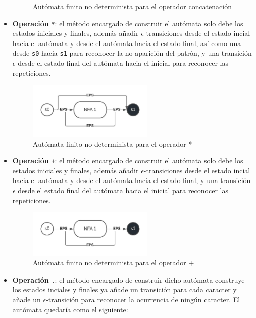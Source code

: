 \begin{itemize}
\begin{figure}
                        \caption{Autómata finito no determinista para el operador concatenación}
                \end{figure}
        \item \textbf{Operación} \verb|*|: el método encargado de construir el autómata solo debe los estados iniciales y finales, además añadir $\epsilon$-transiciones desde el estado incial hacia el autómata y desde el autómata hacia el estado final, así como una desde \verb|s0| hacia \verb|s1| para reconocer la no aparición del patrón, y una transición $\epsilon$ desde el estado final del autómata hacia el inicial para reconocer las repeticiones.
                \begin{figure}
                        \centering
                        \includegraphics[width=6cm]{./chapters/img/star.jpeg}
                        \caption{Autómata finito no determinista para el operador *}
                \end{figure}
        \item \textbf{Operación} \verb|+|: el método encargado de construir el autómata solo debe los estados iniciales y finales, además añadir $\epsilon$-transiciones desde el estado incial hacia el autómata y desde el autómata hacia el estado final, y una transición $\epsilon$ desde el estado final del autómata hacia el inicial para reconocer las repeticiones.
                \begin{figure}
                        \centering
                        \includegraphics[width=6cm]{./chapters/img/plus.jpeg}
                        \caption{Autómata finito no determinista para el operador +}
                \end{figure}
        \item \textbf{Operación} \verb|.|: el método encargado de construir dicho autómata construye los estados inciales y finales ya añade un transición para cada caracter y añade un $\epsilon$-transición para reconocer la ocurrencia de ningún caracter. El autómata quedaría como el siguiente:

\end{itemize}
